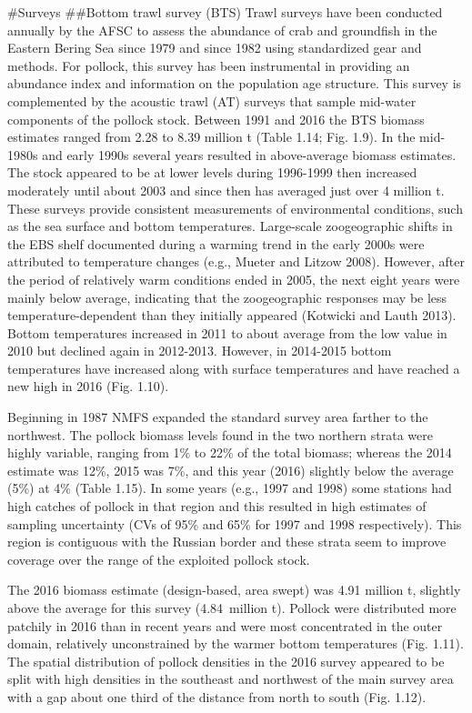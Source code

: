 \#Surveys \#\#Bottom trawl survey (BTS) Trawl surveys have been
conducted annually by the AFSC to assess the abundance of crab and
groundfish in the Eastern Bering Sea since 1979 and since 1982 using
standardized gear and methods. For pollock, this survey has been
instrumental in providing an abundance index and information on the
population age structure. This survey is complemented by the acoustic
trawl (AT) surveys that sample mid-water components of the pollock
stock. Between 1991 and 2016 the BTS biomass estimates ranged from 2.28
to 8.39 million t (Table 1.14; Fig. 1.9). In the mid-1980s and early
1990s several years resulted in above-average biomass estimates. The
stock appeared to be at lower levels during 1996-1999 then increased
moderately until about 2003 and since then has averaged just over 4
million t. These surveys provide consistent measurements of
environmental conditions, such as the sea surface and bottom
temperatures. Large-scale zoogeographic shifts in the EBS shelf
documented during a warming trend in the early 2000s were attributed to
temperature changes (e.g., Mueter and Litzow 2008). However, after the
period of relatively warm conditions ended in 2005, the next eight years
were mainly below average, indicating that the zoogeographic responses
may be less temperature-dependent than they initially appeared (Kotwicki
and Lauth 2013). Bottom temperatures increased in 2011 to about average
from the low value in 2010 but declined again in 2012-2013. However, in
2014-2015 bottom temperatures have increased along with surface
temperatures and have reached a new high in 2016 (Fig. 1.10).

Beginning in 1987 NMFS expanded the standard survey area farther to the
northwest. The pollock biomass levels found in the two northern strata
were highly variable, ranging from 1\% to 22\% of the total biomass;
whereas the 2014 estimate was 12\%, 2015 was 7\%, and this year (2016)
slightly below the average (5\%) at 4\% (Table 1.15). In some years
(e.g., 1997 and 1998) some stations had high catches of pollock in that
region and this resulted in high estimates of sampling uncertainty (CVs
of 95\% and 65\% for 1997 and 1998 respectively). This region is
contiguous with the Russian border and these strata seem to improve
coverage over the range of the exploited pollock stock.

The 2016 biomass estimate (design-based, area swept) was 4.91 million t,
slightly above the average for this survey (4.84~million t). Pollock
were distributed more patchily in 2016 than in recent years and were
most concentrated in the outer domain, relatively unconstrained by the
warmer bottom temperatures (Fig. 1.11). The spatial distribution of
pollock densities in the 2016 survey appeared to be split with high
densities in the southeast and northwest of the main survey area with a
gap about one third of the distance from north to south (Fig. 1.12).

